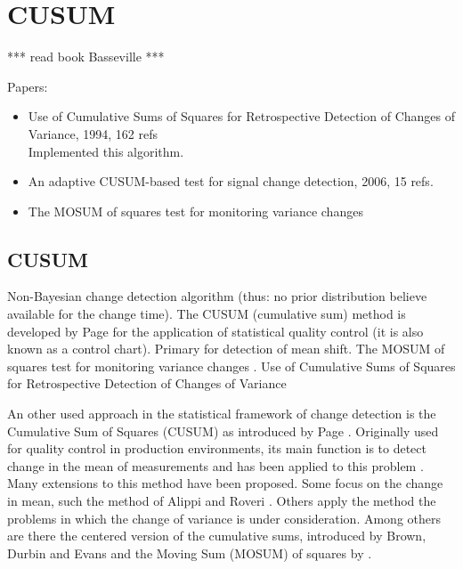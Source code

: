 \section{CUSUM}\label{cusum}

*** read book Basseville \cite{basseville1993detection} ***


Papers:
\begin{itemize}
  \item Use of Cumulative Sums of Squares for Retrospective Detection of Changes of Variance, 1994, 162 refs \cite{inclan1994use} \\
  Implemented this algorithm.
  \item An adaptive CUSUM-based test for signal change detection, 2006, 15 refs. \cite{alippi2006adaptive}
  \item The MOSUM of squares test for monitoring variance changes \cite{hsu2007mosum}
\end{itemize}


\subsection{CUSUM}
Non-Bayesian change detection algorithm (thus: no prior distribution believe available for the change time).
The CUSUM (cumulative sum) method is developed by Page \cite{page1954continuous} for the application of statistical quality control (it is also known as a control chart).
Primary for detection of mean shift.
The MOSUM of squares test for monitoring variance changes \cite{hsu2007mosum}.
Use of Cumulative Sums of Squares for Retrospective Detection of Changes of Variance \cite{inclan1994use}


An other used approach in the statistical framework of change detection is the Cumulative Sum of Squares (CUSUM) as introduced by Page \cite{page1954continuous}.
Originally used for quality control in production environments, its main function is to detect change in the mean of measurements and has been applied to this problem \cite{basseville1993detection}.
Many extensions to this method have been proposed.
Some focus on the change in mean, such the method of Alippi and Roveri \cite{alippi2006adaptive}.
Others apply the method the problems in which the change of variance is under consideration.
Among others are there the centered version of the cumulative sums, introduced by Brown, Durbin and Evans \cite{brown1975techniques} and the Moving Sum (MOSUM) of squares by \cite{hsu2007mosum}.

